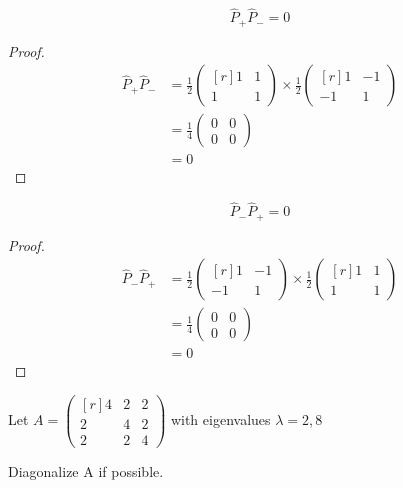\documentclass[11pt]{amsart}
\begin{document}
\[
\hat{P}_+\hat{P}_-=0
\]

\begin{proof}

\begin{equation*}
\begin{split}
\hat{P}_+\hat{P}_-&=
\frac{1}{2}
\begin{pmatrix*}[r]
1&1\\
1&1
\end{pmatrix*}
\times
\frac{1}{2}
\begin{pmatrix*}[r]
1&-1\\
-1&1
\end{pmatrix*}\\
&=
\frac{1}{4}
\begin{pmatrix*}
0&0\\
0&0
\end{pmatrix*}\\
& =
0
\end{split}
\end{equation*}
\end{proof}

\[
\hat{P}_-\hat{P}_+=0
\]

\begin{proof}

\begin{equation*}
\begin{split}
\hat{P}_-\hat{P}_+&=
\frac{1}{2}
\begin{pmatrix*}[r]
1&-1\\
-1&1
\end{pmatrix*}
\times
\frac{1}{2}
\begin{pmatrix*}[r]
1&1\\
1&1
\end{pmatrix*}\\
&=
\frac{1}{4}
\begin{pmatrix*}
0&0\\
0&0
\end{pmatrix*}\\
& =
0
\end{split}
\end{equation*}
\end{proof}

\clearpage

\begin{center}
\begin{tcolorbox}[title= 5.3.12 \hfill Isaac Baer , halign title=center]
\begin{center}
Let $A=
\begin{pmatrix*}[r]
4&2&2\\
2&4&2\\
2&2&4
\end{pmatrix*}$ with eigenvalues $\lambda=2,8$
\end{center}

\vspace{3mm}

Diagonalize A if possible. 
\end{tcolorbox}
\end{center}
\end{document}
